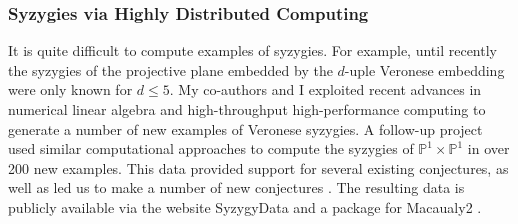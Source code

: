 \documentclass[11pt,reqno]{amsart}
\theoremstyle{remark}
\renewcommand{\P}{\mathbb{P}}
\begin{document}
\subsubsection{Syzygies via Highly Distributed Computing}

It is quite difficult to compute examples of syzygies. For example, until recently the syzygies of the projective plane embedded by the $d$-uple Veronese embedding were only known for $d\leq 5$. My co-authors and I exploited recent advances in numerical linear algebra and high-throughput high-performance computing to generate a number of new examples of Veronese syzygies. A follow-up project used similar computational approaches to compute the syzygies of $\P^{1}\times\P^{1}$ in over 200 new examples. This data provided support for several existing conjectures, as well as led us to make a number of new conjectures \cite{bruceErmanGoldsteinYang18,BCEGLY22}. 
The resulting data is publicly available via the website SyzygyData and a package for Macaualy2 \cite{bruceErman19, M2}.



\end{document}
